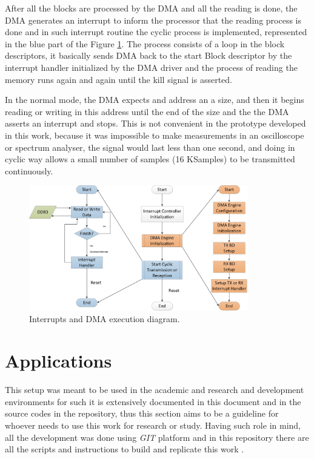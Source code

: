 After all the blocks are processed by the DMA and all the reading is done, the
DMA generates an interrupt to inform the processor that the reading process is
done and in such interrupt routine the cyclic process is implemented,
represented in the blue part of the Figure \ref{fig:intcdmainit}. The process
consists of a loop in the block descriptors, it basically sends DMA back to the
start Block descriptor by the interrupt handler initialized by the DMA driver
and the process of reading the memory runs again and again until the kill signal
is asserted.

In the normal mode, the DMA expects and address an a size, and then it begins
reading or writing in this address until the end of the size and the the DMA
asserts an interrupt and stops. This is not convenient in the prototype
developed in this work, because it was impossible to make measurements in an
oscilloscope or spectrum analyser, the signal would last less than one second,
and doing in cyclic way allows a small number of samples (16 KSamples) to be
transmitted continuously.

\begin{figure}[htbp]
    \centering
    \includegraphics[width=0.85\textwidth]{./figures/dma_intc_driver}
    \caption{ Interrupts and DMA execution diagram.
    \label{fig:intcdmainit}}
\end{figure}

\section{Applications}
%
This setup was meant to be used in the academic and research and development
environments for such it is extensively documented in this document and in the
source codes in the repository, thus this section aims to be a guideline for
whoever needs to use this work for research or study. Having such role in mind,
all the development was done using \emph{GIT} platform and in this repository
there are all the scripts and instructions to build and replicate this work
\cite{web:gitproject}.

